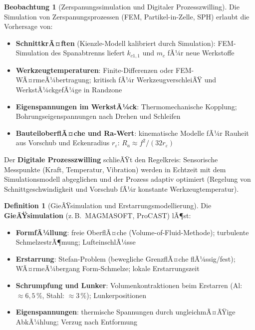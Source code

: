 ﻿\documentclass[a4paper,12pt]{report}
\theoremstyle{definition}
\newtheorem{definition}{Definition}
\newtheorem{beobachtung}{Beobachtung}
\begin{document}
\begin{beobachtung}[Zerspanungssimulation und Digitaler Prozesszwilling]
Die Simulation von Zerspanungsprozessen (FEM, Partikel-in-Zelle, SPH)
erlaubt die Vorhersage von:
\begin{itemize}
    \item[-] \textbf{SchnittkrÃ¤ften} (Kienzle-Modell kalibriert durch Simulation):
          FEM-Simulation des Spanabtrenns liefert $k_{c1,1}$ und $m_c$ fÃ¼r neue Werkstoffe
    \item[-] \textbf{Werkzeugtemperaturen}: Finite-Differenzen oder FEM-WÃ¤rmeÃ¼bertragung;
          kritisch fÃ¼r WerkzeugverschleiÃŸ und WerkstÃ¼ckgefÃ¼ge in Randzone
    \item[-] \textbf{Eigenspannungen im WerkstÃ¼ck}: Thermomechanische Kopplung;
          Bohrungseigenspannungen nach Drehen und Schleifen
    \item[-] \textbf{BauteiloberflÃ¤che und Ra-Wert}: kinematische Modelle
          fÃ¼r Rauheit aus Vorschub und Eckenradius $r_\varepsilon$:
          $R_a \approx f^2/(32 r_\varepsilon)$
\end{itemize}
Der \textbf{Digitale Prozesszwilling} schlieÃŸt den Regelkreis:
Sensorische Messpunkte (Kraft, Temperatur, Vibration) werden in Echtzeit
mit dem Simulationsmodell abgeglichen und der Prozess adaptiv optimiert
(Regelung von Schnittgeschwindigkeit und Vorschub fÃ¼r konstante Werkzeugtemperatur).
\end{beobachtung}

\begin{definition}[GieÃŸsimulation und Erstarrungsmodellierung]
Die \textbf{GieÃŸsimulation} (z.\,B.\ MAGMASOFT, ProCAST) lÃ¶st:
\begin{itemize}
    \item[-] \textbf{FormfÃ¼llung}: freie OberflÃ¤che (Volume-of-Fluid-Methode);
          turbulente SchmelzestrÃ¶mung; LufteinschlÃ¼sse
    \item[-] \textbf{Erstarrung}: Stefan-Problem (bewegliche GrenzflÃ¤che
          flÃ¼ssig/fest); WÃ¤rmeÃ¼bergang Form-Schmelze; lokale Erstarrungszeit
    \item[-] \textbf{Schrumpfung und Lunker}: Volumenkontraktionen beim Erstarren
          (Al: $\approx 6{,}5\,\%$, Stahl: $\approx 3\,\%$); Lunkerpositionen
    \item[-] \textbf{Eigenspannungen}: thermische Spannungen durch ungleichmÃ¤ÃŸige
          AbkÃ¼hlung; Verzug nach Entformung
\end{itemize}
\end{definition}
\end{document}
